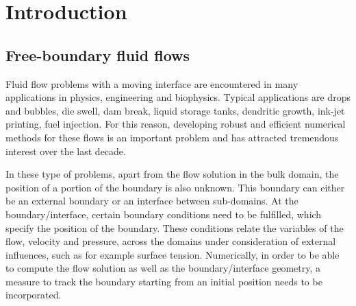 \chapter{\sc Introduction}
\label{ch:introduction}

\section[Free-boundary fluid flows]{Free-boundary fluid flows}
Fluid flow problems with a moving interface are encountered in many
applications in physics, engineering and biophysics. Typical applications are
drops and bubbles, die swell, dam break, liquid storage tanks, dendritic growth,
ink-jet printing, fuel injection. For this reason, developing robust and
efficient numerical methods for these flows is an important problem and
has attracted tremendous interest over the last decade.

In these type of problems, apart from the flow solution in the bulk domain, the
position of a portion of the boundary is also unknown. This boundary can either
be an external boundary or an interface between sub-domains. At the
boundary/interface, certain boundary conditions need to be fulfilled, which
specify the position of the boundary. These conditions relate the variables of
the flow, velocity and pressure, across the domains under consideration of
external influences, such as for example surface tension. Numerically, in order
to be able to compute the flow solution as well as the boundary/interface
geometry, a measure to track the boundary starting from an initial position
needs to be incorporated.

